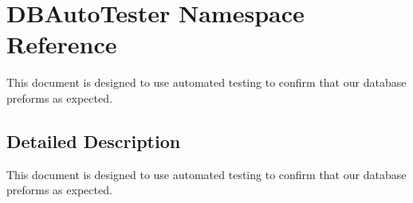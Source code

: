\hypertarget{namespaceDBAutoTester}{\section{D\-B\-Auto\-Tester Namespace Reference}
\label{namespaceDBAutoTester}
}


This document is designed to use automated testing to confirm that our database preforms as expected.  




\subsection{Detailed Description}
This document is designed to use automated testing to confirm that our database preforms as expected. 